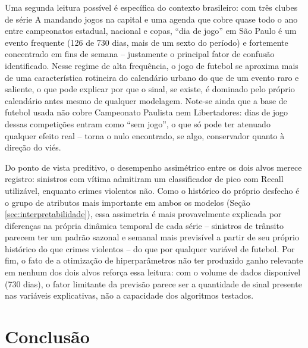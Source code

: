 \documentclass[12pt]{article}
\begin{document}
Uma segunda leitura possível é específica do contexto brasileiro: com
três clubes de série A mandando jogos na capital e uma agenda que cobre
quase todo o ano entre campeonatos estadual, nacional e copas, ``dia de
jogo'' em São Paulo é um evento frequente (126 de 730 dias, mais de um
sexto do período) e fortemente concentrado em fins de semana --
justamente o principal fator de confusão identificado. Nesse regime de
alta frequência, o jogo de futebol se aproxima mais de uma característica
rotineira do calendário urbano do que de um evento raro e saliente, o que
pode explicar por que o sinal, se existe, é dominado pelo próprio
calendário antes mesmo de qualquer modelagem. Note-se ainda que a base de
futebol usada não cobre Campeonato Paulista nem Libertadores: dias de
jogo dessas competições entram como ``sem jogo'', o que só pode ter
atenuado qualquer efeito real -- torna o nulo encontrado, se algo,
conservador quanto à direção do viés.

Do ponto de vista preditivo, o desempenho assimétrico entre os dois
alvos merece registro: sinistros com vítima admitiram um classificador
de pico com Recall utilizável, enquanto crimes violentos não. Como o
histórico do próprio desfecho é o grupo de atributos mais importante em
ambos os modelos (Seção \ref{sec:interpretabilidade}), essa assimetria é
mais provavelmente explicada por diferenças na própria dinâmica temporal
de cada série -- sinistros de trânsito parecem ter um padrão sazonal e
semanal mais previsível a partir de seu próprio histórico do que crimes
violentos -- do que por qualquer variável de futebol. Por fim, o fato de
a otimização de hiperparâmetros não ter produzido ganho relevante em
nenhum dos dois alvos reforça essa leitura: com o volume de dados
disponível (730 dias), o fator limitante da previsão parece ser a
quantidade de sinal presente nas variáveis explicativas, não a
capacidade dos algoritmos testados.

\section{Conclusão}
\end{document}
